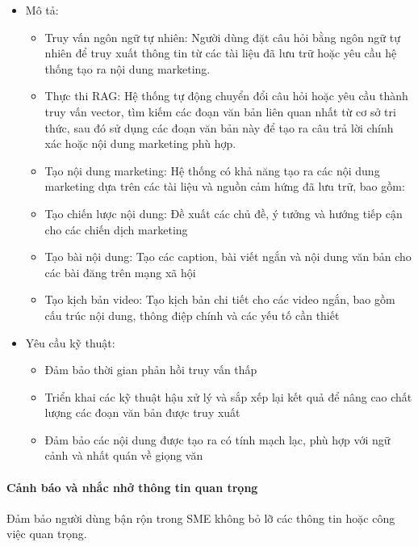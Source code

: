 \begin{itemize}
\item
  Mô tả:

  \begin{itemize}
  \item
    Truy vấn ngôn ngữ tự nhiên: Người dùng đặt câu hỏi bằng ngôn ngữ tự
    nhiên để truy xuất thông tin từ các tài liệu đã lưu trữ hoặc yêu cầu
    hệ thống tạo ra nội dung marketing.
  \item
    Thực thi RAG: Hệ thống tự động chuyển đổi câu hỏi hoặc yêu cầu thành
    truy vấn vector, tìm kiếm các đoạn văn bản liên quan nhất từ cơ sở
    tri thức, sau đó sử dụng các đoạn văn bản này để tạo ra câu trả lời
    chính xác hoặc nội dung marketing phù hợp.
  \item
    Tạo nội dung marketing: Hệ thống có khả năng tạo ra các nội dung
    marketing dựa trên các tài liệu và nguồn cảm hứng đã lưu trữ, bao
    gồm:
  \item
    Tạo chiến lược nội dung: Đề xuất các chủ đề, ý tưởng và hướng tiếp
    cận cho các chiến dịch marketing
  \item
    Tạo bài nội dung: Tạo các caption, bài viết ngắn và nội dung văn bản
    cho các bài đăng trên mạng xã hội
  \item
    Tạo kịch bản video: Tạo kịch bản chi tiết cho các video ngắn, bao
    gồm cấu trúc nội dung, thông điệp chính và các yếu tố cần thiết
  \end{itemize}
\item
  Yêu cầu kỹ thuật:

  \begin{itemize}
  \item
    Đảm bảo thời gian phản hồi truy vấn thấp
  \item
    Triển khai các kỹ thuật hậu xử lý và sắp xếp lại kết quả để nâng cao
    chất lượng các đoạn văn bản được truy xuất
  \item
    Đảm bảo các nội dung được tạo ra có tính mạch lạc, phù hợp với ngữ
    cảnh và nhất quán về giọng văn
  \end{itemize}
\end{itemize}

\paragraph{Cảnh báo và nhắc nhở thông tin quan
trọng}\label{cux1ea3nh-buxe1o-vuxe0-nhux1eafc-nhux1edf-thuxf4ng-tin-quan-trux1ecdng}

Đảm bảo người dùng bận rộn trong SME không bỏ lỡ các thông tin hoặc công
việc quan trọng.

